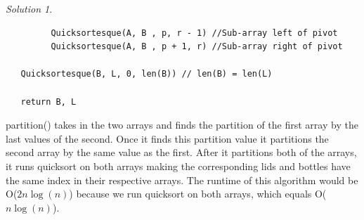 \documentclass[12pt]{article}
\theoremstyle{remark}
\newtheorem*{solution}{Solution}
\begin{document}
\begin{enumerate}
\begin{solution}
\begin{verbatim}
         Quicksortesque(A, B , p, r - 1) //Sub-array left of pivot
         Quicksortesque(A, B , p + 1, r) //Sub-array right of pivot

   Quicksortesque(B, L, 0, len(B)) // len(B) = len(L)
   
   return B, L
\end{verbatim}
partition() takes in the two arrays and finds the partition of the first array by the last values of the second. Once it finds this partition value it partitions the second array by the same value as the first. After it partitions both of the arrays, it runs quicksort on both arrays making the corresponding lids and bottles have the same index in their respective arrays. The runtime of this algorithm would be O($2n\log(n)$) because we run quicksort on both arrays, which equals O($n\log(n)$).
    \end{solution}
    
\end{enumerate}
\end{document}
